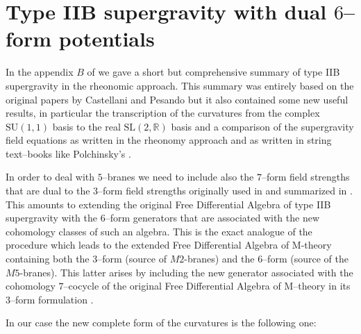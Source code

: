 \documentclass[a4paper,11pt]{article}
\begin{document}
\section{Type IIB supergravity with dual $6$--form potentials}
In the appendix $B$ of \cite{noidued3} we gave
a short but comprehensive summary of type IIB supergravity in the
rheonomic approach. This summary was entirely based on the original papers by
Castellani and Pesando \cite{castella2b,igorleo} but it also contained
some new useful results, in particular the transcription of the
curvatures from the complex $\mathrm{SU(1,1)}$ basis to the real
$ \mathrm{SL(2,\mathbb{R})}$ basis and a comparison of the
supergravity field equations as written in the rheonomy approach and
as written in string text--books like Polchinsky's \cite{polchinski}.
\par
In order to deal with $5$--branes we need to include also the
$7$--form field strengths that are dual to the $3$--form field
strengths originally used in \cite{castella2b,igorleo} and summarized
in \cite{noidued3}. This amounts to extending the original Free
Differential Algebra of type IIB supergravity with the $6$--form
generators that are associated with the new cohomology classes of
such an algebra. This is the exact analogue of the procedure which
leads to the extended  Free Differential Algebra of M-theory
\cite{pietd11} containing both
the $3$--form (source of $M2$-branes) and the $6$--form (source of the $M5$-branes). This latter arises
by including the new generator associated with the cohomology $7$--cocycle of the
original Free Differential Algebra of M--theory in its $3$--form
formulation \cite{riccapiet}.
\par
In our case the new complete form of the curvatures is the following
one:
\end{document}
